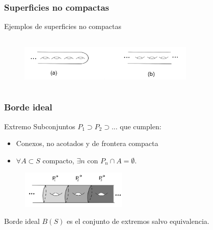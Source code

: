 \documentclass{beamer}
\begin{document}
\begin{frame}
\frametitle{Superficies no compactas}

Ejemplos de superficies no compactas
\begin{figure}[htb]
\begin{center}
\includegraphics[width=3.3in,height=1in]{imagenes/ejemplonocompactas.png} 
\end{center}
\end{figure}


\end{frame}

\begin{frame}
\frametitle{Borde ideal}
\begin{block}
{Extremo}
Subconjuntos $P_1 \supset P_2 \supset ...$ que cumplen:
\begin{itemize}
\item Conexos, no acotados y de frontera compacta
\item $\forall A\subset S$ compacto, $\exists n$ con $P_n \cap A = \emptyset$.
\end{itemize}

\begin{figure}[htb]
\begin{center}
\includegraphics[width=2in,height=0.7in]{imagenes/final.png} 
\end{center}
\end{figure}
\end{block}


\begin{block}{Borde ideal}
$B(S)$ es el conjunto de extremos salvo equivalencia.
\end{block}
\end{frame}
\end{document}
